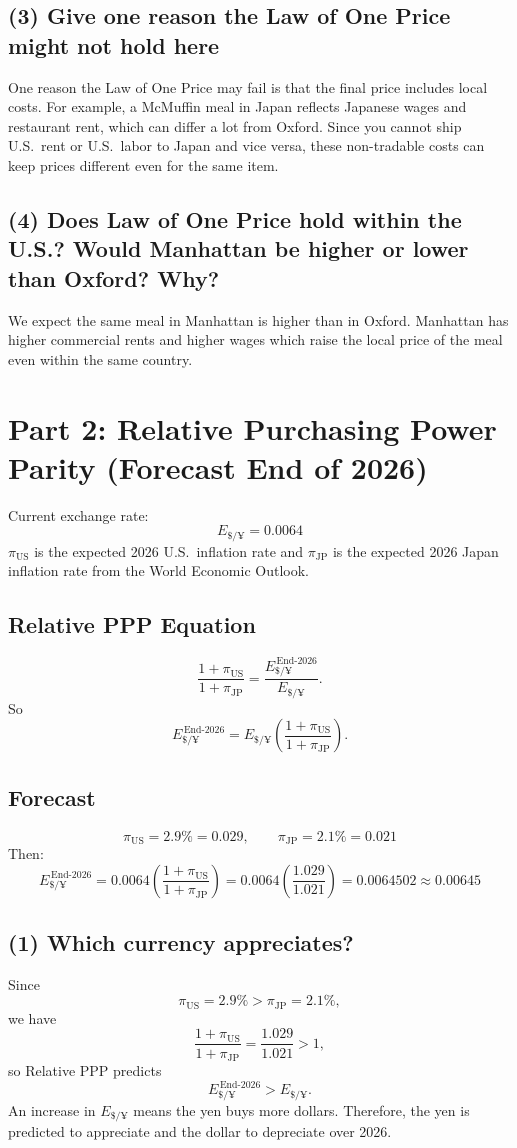 \documentclass[11pt]{article}
\newcommand{\usd}{\text{\$}}
\begin{document}
\subsection*{(3) Give one reason the Law of One Price might not hold here}
One reason the Law of One Price may fail is that the final price includes local costs. For example, a McMuffin meal in Japan reflects Japanese wages and restaurant rent, which can differ a lot from Oxford. Since you cannot ship U.S.\ rent or U.S.\ labor to Japan and vice versa, these non-tradable costs can keep prices different even for the same item.

\subsection*{(4) Does Law of One Price hold within the U.S.? Would Manhattan be higher or lower than Oxford? Why?}
We expect the same meal in Manhattan is higher than in Oxford. Manhattan has higher commercial rents and higher wages which raise the local price of the meal even within the same country.

\section*{Part 2: Relative Purchasing Power Parity (Forecast End of 2026)}

Current exchange rate:
\[
E_{\usd/\yen} = 0.0064
\]
$\pi_{\text{US}}$ is the expected 2026 U.S.\ inflation rate and $\pi_{\text{JP}}$ is the expected 2026 Japan inflation rate from the World Economic Outlook.

\subsection*{Relative PPP Equation}
\[
\frac{1+\pi_{\text{US}}}{1+\pi_{\text{JP}}}
=
\frac{E_{\usd/\yen}^{\,\text{End-2026}}}{E_{\usd/\yen}}.
\]
So
\[
E_{\usd/\yen}^{\,\text{End-2026}}
=
E_{\usd/\yen}\left(\frac{1+\pi_{\text{US}}}{1+\pi_{\text{JP}}}\right).
\]

\subsection*{Forecast}
\[
\pi_{\text{US}} = 2.9\% = 0.029,
\qquad
\pi_{\text{JP}} = 2.1\% = 0.021
\]
Then:
\[
E_{\usd/\yen}^{\,\text{End-2026}}
=
0.0064\left(\frac{1+\pi_{\text{US}}}{1+\pi_{\text{JP}}}\right)
=
0.0064\left(\frac{1.029}{1.021}\right)
=
0.0064502
\approx
0.00645
\]

\subsection*{(1) Which currency appreciates?}
Since
\[
\pi_{\text{US}} = 2.9\% > \pi_{\text{JP}} = 2.1\%,
\]
we have
\[
\frac{1+\pi_{\text{US}}}{1+\pi_{\text{JP}}}
=
\frac{1.029}{1.021}
>
1,
\]
so Relative PPP predicts
\[
E_{\usd/\yen}^{\,\text{End-2026}} > E_{\usd/\yen}.
\]
An increase in $E_{\usd/\yen}$ means the yen buys more dollars. Therefore, the yen is predicted to appreciate and the dollar to depreciate over 2026.
\end{document}
